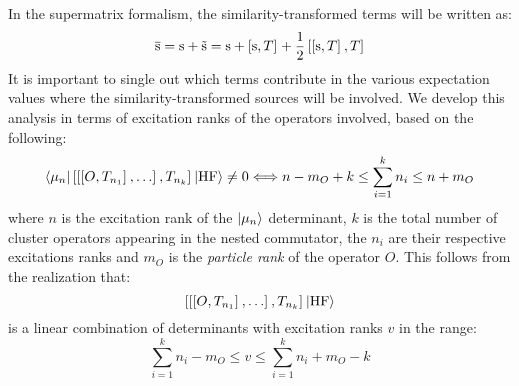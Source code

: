 In the supermatrix formalism, the similarity-transformed terms will be
written as:
\begin{equation}
  \overline{\mathrm{s}} = \mathrm{s} + \tilde{\mathrm{s}} = \mathrm{s} +
  \left[ \mathrm{s}, T \right]^{} +
  \frac{1}{2}\left[ \left[ \mathrm{s}, T \right]^{}, T \right]^{}
\end{equation}
It is important to single out which terms contribute in the various
expectation values where the similarity-transformed sources will be
involved.
We develop this analysis in terms of excitation ranks of the
operators involved, based on the following:
\begin{equation}
  \braket{\mu_n |
  \left[ \left[ \left[ O, T_{n_1} \right]^{}, \ldots \right]^{}, T_{n_k} \right]^{} | \mathrm{HF}} \neq 0
  \Longleftrightarrow
  n - m_O + k \leq \sum_{i=1}^k n_i \leq n + m_O
\end{equation}
where $n$ is the excitation rank of the $\ket{\mu_n}$ determinant, $k$
is the total number of cluster operators appearing in the nested
commutator, the $n_i$ are their respective excitations ranks and $m_O$
is the \emph{particle rank} of the operator $O$.\autocite{Helgaker2000-tz}
This follows from the realization that:
\begin{equation}
  \left[ \left[ \left[ O, T_{n_1} \right]^{}, \ldots \right]^{}, T_{n_k} \right]^{} \ket{\mathrm{HF}}
\end{equation}
is a linear combination of determinants with excitation ranks $v$ in the
range:
\begin{equation}
  \sum_{i=1}^k n_i - m_O \leq v \leq \sum_{i=1}^k n_i + m_O -k
\end{equation}

